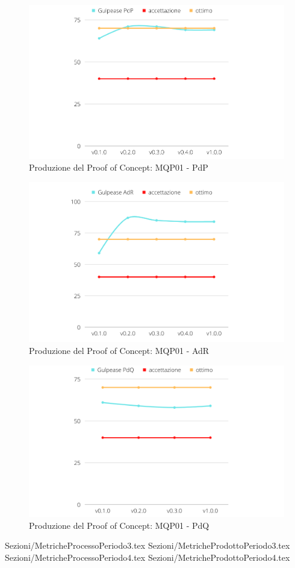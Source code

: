 \begin{figure}[H]
    \centering
    \includegraphics[scale=0.50]{Sezioni/images/poc-gulpease-pdp.png}
    \caption{Produzione del Proof of Concept: MQP01 - PdP}
\end{figure}


\begin{figure}[H]
    \centering
    \includegraphics[scale=0.50]{Sezioni/images/poc-gulpease-adr.png}
    \caption{Produzione del Proof of Concept: MQP01 - AdR}
\end{figure}


\begin{figure}[H]
    \centering
    \includegraphics[scale=0.50]{Sezioni/images/poc-gulpease-pdq.png}
    \caption{Produzione del Proof of Concept: MQP01 - PdQ}
\end{figure}

\pagebreak
 {Sezioni/MetricheProcessoPeriodo3.tex}
 {Sezioni/MetricheProdottoPeriodo3.tex}
 {Sezioni/MetricheProcessoPeriodo4.tex}
 {Sezioni/MetricheProdottoPeriodo4.tex}